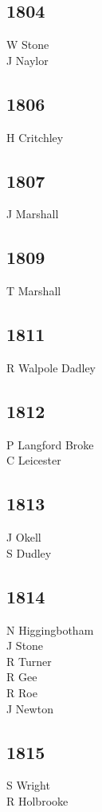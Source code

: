 \begin{multicols}{3}
  \subsection*{1804}
  W Stone \\
  J Naylor \\
  \subsection*{1806}
  H Critchley \\
  \subsection*{1807}
  J Marshall \\
  \subsection*{1809}
  T Marshall \\
  \subsection*{1811}
  R Walpole Dadley \\
  \subsection*{1812}
  P Langford Broke \\
  C Leicester \\
  \subsection*{1813}
  J Okell \\
  S Dudley \\
  \subsection*{1814}
  N Higgingbotham \\
  J Stone \\
  R Turner \\
  R Gee \\
  R Roe \\
  J Newton \\
  \subsection*{1815}
  S Wright \\
  R Holbrooke \\

\end{multicols}
